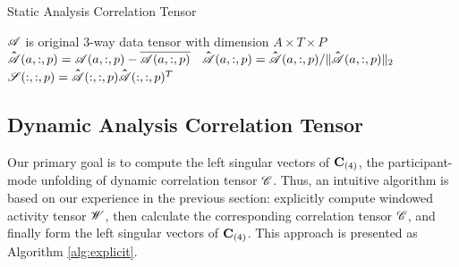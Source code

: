 \documentclass{article}[12pt]
\newcommand{\M}[2][]{{\boldsymbol{#1\mathbf{\MakeUppercase{#2}}}}}
\newcommand{\T}[2][]{\boldsymbol{#1\mathscr{\MakeUppercase{#2}}}}
\newcommand{\Mz}[3][]{\M[#1]{#2}_{(#3)}}
\begin{document}

\begin{algorithm}
\caption{Static Analysis Correlation Tensor}
\label{alg:static}
\begin{algorithmic}[1]
\Require $\T{A}$ is original 3-way data tensor with dimension $A \times T \times P$
      \State \texttt{$\T [\hat]{A}(a,:,p) = \T {A}(a,:,p)  - \overline{{\T A}(a,:,p)} $ } \hfill {}
      \State \texttt{$\T [\hat]{A}(a,:,p) = \T [\hat]{A}(a,:,p)/ {\|{\T [\hat]A}(a,:,p)\|_2}$ }   \hfill {}
   \EndFor
   \State \texttt{$\T {S}(:,:,p) = {\T [\hat]A}(:,:,p) {\T [\hat]A}(:,:,p)^T$ } \hfill {}
 \EndFor
\end{algorithmic}
\end{algorithm}




\subsection{Dynamic Analysis Correlation Tensor}
Our primary goal is to compute the left singular vectors of $\Mz{C}{4}$, the participant-mode unfolding of dynamic correlation tensor $\T {C}$. Thus, an intuitive algorithm is based on our experience in the previous section: explicitly compute windowed activity tensor $\T {W}$, then calculate the corresponding correlation tensor $\T {C}$, and finally form the left singular vectors of $\Mz{C}{4}$.
This approach is presented as Algorithm \ref{alg:explicit}.
\end{document}
